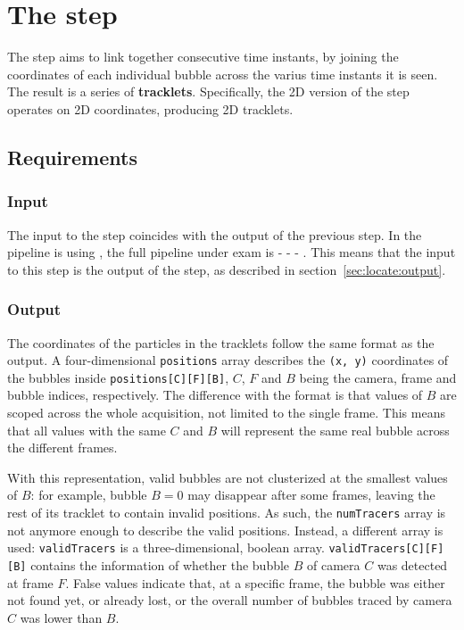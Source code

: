 \chapter{The \linkDD* step}
\label{chap:2dlink}

The \link* step aims to link together consecutive time instants, by joining the coordinates of each individual bubble across the varius time instants it is seen.
The result is a series of \textbf{tracklets}.
Specifically, the 2D version of the \link* step operates on 2D coordinates, producing 2D tracklets.

\section{Requirements}

\subsection{Input}

The input to the \link* step coincides with the output of the previous step.
In the pipeline is using \linkDD*, the full pipeline under exam is \locate* - \link* - \match* - \visual*.
This means that the input to this step is the output of the \locate* step, as described in section~\ref{sec:locate:output}.

\subsection{Output}
\label{sec:linkDD:output}

The coordinates of the particles in the tracklets follow the same format as the \locate* output.
A four-dimensional \texttt{positions} array describes the \texttt{(x, y)} coordinates of the bubbles inside \texttt{positions[C][F][B]}, $C$, $F$ and $B$ being the camera, frame and bubble indices, respectively.
The difference with the \locate* format is that values of $B$ are scoped across the whole acquisition, not limited to the single frame.
This means that all values with the same $C$ and $B$ will represent the same real bubble across the different frames.

With this representation, valid bubbles are not clusterized at the smallest values of $B$: for example, bubble $B{=}0$ may disappear after some frames, leaving the rest of its tracklet to contain invalid positions.
As such, the \texttt{numTracers} array is not anymore enough to describe the valid positions.
Instead, a different array is used: \texttt{validTracers} is a three-dimensional, boolean array.
\texttt{validTracers[C][F][B]} contains the information of whether the bubble $B$ of camera $C$ was detected at frame $F$.
False values indicate that, at a specific frame, the bubble was either not found yet, or already lost, or the overall number of bubbles traced by camera $C$ was lower than $B$.

